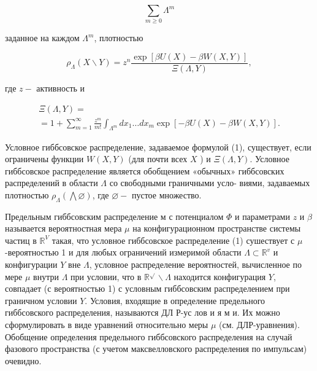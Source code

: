 \documentclass[10pt]{article}
\begin{document}
\[

\sum_{m \geqslant 0} \Lambda^{m}

\]



заданное на каждом $\Lambda^{m}$, плотностью



\[

\rho_{\Lambda}(X \backslash Y)=z^{n} \frac{\exp [\beta U(X)-\beta W(X, Y)]}{\Xi(\Lambda, Y)},

\]



где $z-$ активность и



\[

\begin{gathered}

\Xi(\Lambda, Y)= \\

=1+\sum_{m=1}^{\infty} \frac{z^{m}}{m !} \int_{\Lambda^{m}} d x_{1} \ldots d x_{m} \exp [-\beta U(X)-\beta W(X, Y)] .

\end{gathered}

\]



Условное гиббсовское распределение, задаваемое формулой (1), существует, если ограничены функции $W(X, Y)$ (для почти всех $X$ ) и $\Xi(\Lambda, Y)$. Условное гиббсовское распределение является обобщением «обычных» гиббсовских распределений в области $\Lambda$ со свободными граничными усло- виями, задаваемых плотностью $\rho_{\Lambda}(\bigwedge \varnothing)$, где $\varnothing-$ пустое множество.



Предельным гиббсовским распределение м с потенциалом $\Phi$ и параметрами $z$ и $\beta$ называется вероятностная мера $\mu$ на конфигурационном пространстве системы частиц в $\mathbb{R}^{V}$ такая, что условное гиббсовское распределение (1) сушествует с $\mu$-вероятностью 1 и для любых ограничений измеримой области $\Lambda \subset \mathbb{R}^{v}$ и конфигурации $Y$ вне $\Lambda$, условное распределение вероятностей, вычисленное по мере $\mu$ внутри $\Lambda$ при условии, что в $\mathbb{R}^{\sqrt{ }} \backslash \Lambda$ находится конфигурация $Y$, совпадает (с вероятностью 1) с условным гиббсовским распределением при граничном условии $Y$. Условия, входящие в определение предельного гиббсовского распределения, называются ДЛ Р-ус лов и я м и. Их можно сформулировать в виде уравнений относительно меры $\mu$ (см. ДЛР-уравнения). Обобщение определения предельного гиббсовского распределения на случай фазового пространства (с учетом максвелловского распределения по импульсам) очевидно.
\end{document}
